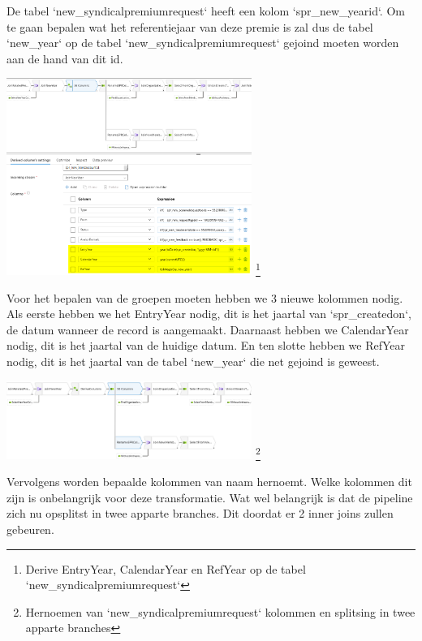 De tabel `new\_syndicalpremiumrequest` heeft een kolom `spr\_new\_yearid`. Om te gaan bepalen wat het referentiejaar van deze premie is zal dus de tabel `new\_year` op de tabel `new\_syndicalpremiumrequest` gejoind moeten worden aan de hand van dit id.


\begin{center}
    \includegraphics[width=0.6\textwidth]{./graphics/adf/bepalen_groep_2.png}
    \footnote{Derive EntryYear, CalendarYear en RefYear op de tabel `new\_syndicalpremiumrequest`}
\end{center}

Voor het bepalen van de groepen moeten hebben we 3 nieuwe kolommen nodig. Als eerste hebben we het EntryYear nodig, dit is het jaartal van `spr\_createdon`, de datum wanneer de record is aangemaakt. Daarnaast hebben we CalendarYear nodig, dit is het jaartal van de huidige datum. En ten slotte hebben we RefYear nodig, dit is het jaartal van de tabel `new\_year` die net gejoind is geweest.

\begin{center}
    \includegraphics[width=0.6\textwidth]{./graphics/adf/bepalen_groep_3.png}
    \footnote{Hernoemen van `new\_syndicalpremiumrequest` kolommen en splitsing in twee apparte branches}
\end{center}

Vervolgens worden bepaalde kolommen van naam hernoemt. Welke kolommen dit zijn is onbelangrijk voor deze transformatie. Wat wel belangrijk is dat de pipeline zich nu opsplitst in twee apparte branches. Dit doordat er 2 inner joins zullen gebeuren.

